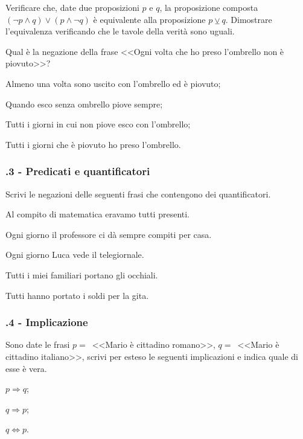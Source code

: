 \begin{esercizio}
\label{ese:\thechapter.9}
Verificare che, date due proposizioni $ p $ e $ q $, la proposizione composta  $(\neg p\wedge q)\vee (p\wedge \neg q)$  è equivalente alla proposizione  $p\veebar q$. Dimostrare l'equivalenza verificando che le tavole della verità sono uguali.
\end{esercizio}

\begin{esercizio}
\label{ese:\thechapter.10}
Qual è la negazione della frase <<Ogni volta che ho preso l'ombrello non è piovuto>>?
\begin{enumeratea}
\item Almeno una volta sono uscito con l'ombrello ed è piovuto;
\item Quando esco senza ombrello piove sempre;
\item Tutti i giorni in cui non piove esco con l'ombrello;
\item Tutti i giorni che è piovuto ho preso l'ombrello.
\end{enumeratea}
\end{esercizio}

\subsubsection*{\thechapter.3 - Predicati e quantificatori}

\begin{esercizio}
\label{ese:\thechapter.11}
Scrivi le negazioni delle seguenti frasi che contengono dei
quantificatori.
\begin{enumeratea}
\item Al compito di matematica eravamo tutti presenti.
\item Ogni giorno il professore ci dà sempre compiti per casa.
\item Ogni giorno Luca vede il telegiornale.
\item Tutti i miei familiari portano gli occhiali.
\item Tutti hanno portato i soldi per la gita.
\end{enumeratea}
\end{esercizio}

\subsubsection*{\thechapter.4 - Implicazione}

\begin{esercizio}
\label{ese:\thechapter.12}
Sono date le frasi $ p = $~<<Mario è cittadino romano>>, $ q = $~<<Mario è
cittadino italiano>>, scrivi per esteso le seguenti implicazioni e indica quale di esse è vera.
\begin{multicols}{3}
 \begin{enumeratea}
 \item $p\Rightarrow q$;
 \item $q\Rightarrow p$;
 \item $q\Leftrightarrow p$.
 \end{enumeratea}
\end{multicols}
\end{esercizio}

